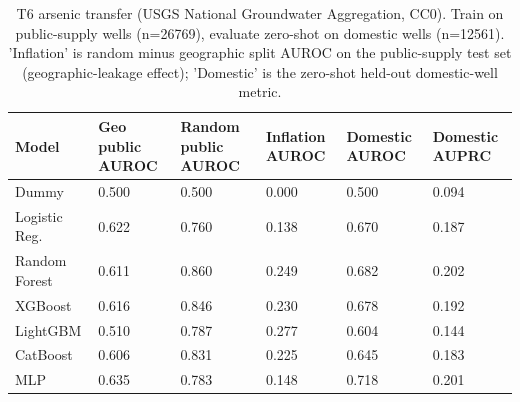 \begin{table}
\caption{T6 arsenic transfer (USGS National Groundwater Aggregation, CC0). Train on public-supply wells (n=26769), evaluate zero-shot on domestic wells (n=12561). 'Inflation' is random minus geographic split AUROC on the public-supply test set (geographic-leakage effect); 'Domestic' is the zero-shot held-out domestic-well metric.}
\label{tab:t6arsenic}
\begin{tabular}{llllll}
\toprule
Model & Geo public AUROC & Random public AUROC & Inflation AUROC & Domestic AUROC & Domestic AUPRC \\
\midrule
Dummy & 0.500 & 0.500 & 0.000 & 0.500 & 0.094 \\
Logistic Reg. & 0.622 & 0.760 & 0.138 & 0.670 & 0.187 \\
Random Forest & 0.611 & 0.860 & 0.249 & 0.682 & 0.202 \\
XGBoost & 0.616 & 0.846 & 0.230 & 0.678 & 0.192 \\
LightGBM & 0.510 & 0.787 & 0.277 & 0.604 & 0.144 \\
CatBoost & 0.606 & 0.831 & 0.225 & 0.645 & 0.183 \\
MLP & 0.635 & 0.783 & 0.148 & 0.718 & 0.201 \\
\bottomrule
\end{tabular}
\end{table}
